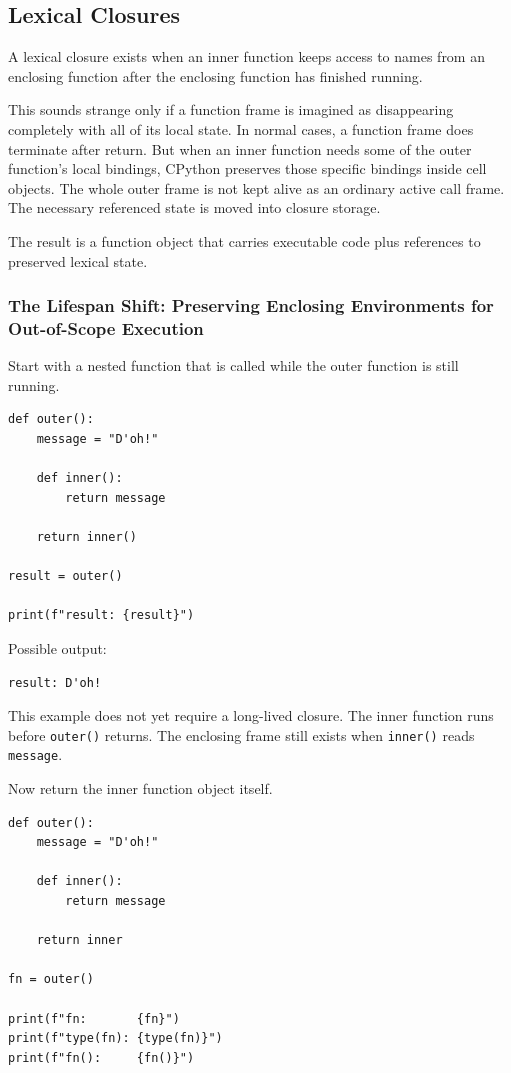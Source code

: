 \subsection{Lexical Closures}

A lexical closure exists when an inner function keeps access to names from an enclosing function after the enclosing function has finished running.

This sounds strange only if a function frame is imagined as disappearing completely with all of its local state. In normal cases, a function frame does terminate after return. But when an inner function needs some of the outer function's local bindings, CPython preserves those specific bindings inside cell objects. The whole outer frame is not kept alive as an ordinary active call frame. The necessary referenced state is moved into closure storage.

The result is a function object that carries executable code plus references to preserved lexical state.

\subsubsection{The Lifespan Shift: Preserving Enclosing Environments for Out-of-Scope Execution}

Start with a nested function that is called while the outer function is still running.

\begin{verbatim}
def outer():
    message = "D'oh!"

    def inner():
        return message

    return inner()

result = outer()

print(f"result: {result}")
\end{verbatim}

Possible output:

\begin{verbatim}
result: D'oh!
\end{verbatim}

This example does not yet require a long-lived closure. The inner function runs before \texttt{outer()} returns. The enclosing frame still exists when \texttt{inner()} reads \texttt{message}.

Now return the inner function object itself.

\begin{verbatim}
def outer():
    message = "D'oh!"

    def inner():
        return message

    return inner

fn = outer()

print(f"fn:       {fn}")
print(f"type(fn): {type(fn)}")
print(f"fn():     {fn()}")
\end{verbatim}


